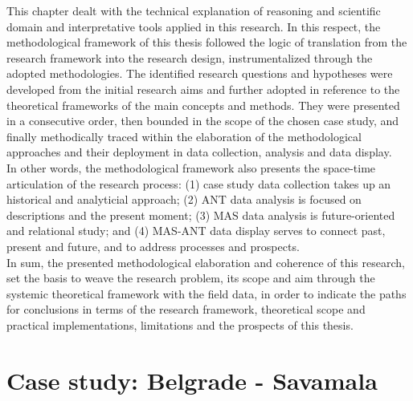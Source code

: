\documentclass[11pt]{report}
\begin{document}
This chapter dealt with the technical explanation of reasoning and scientific domain and interpretative tools applied in this research.
In this respect, the methodological framework of this thesis followed the logic of translation from the research framework into the research design, instrumentalized through the adopted methodologies.
The identified research questions and hypotheses were developed from the initial research aims and further adopted in reference to the theoretical frameworks of the main concepts and methods. 
They were presented in a consecutive order, then bounded in the scope of the chosen case study, and finally methodically traced within the elaboration of the methodological approaches and their deployment in data collection, analysis and data display.
\\
In other words, the methodological framework also presents the space-time articulation of the research process:
(1) case study data collection takes up an historical and analyticial approach;
(2) ANT data analysis is focused on descriptions and the present moment;
(3) MAS data analysis is future-oriented and relational study;
and
(4) MAS-ANT data display serves to connect past, present and future, and to address processes and prospects.
\\
In sum, the presented methodological elaboration and coherence of this research, set the basis to weave the research problem, its scope and aim through the systemic theoretical framework with the field data, in order to indicate the paths for conclusions in terms of the research framework, theoretical scope and practical implementations, limitations and the prospects of this thesis.



\chapter{Case study: Belgrade - Savamala}
\end{document}
